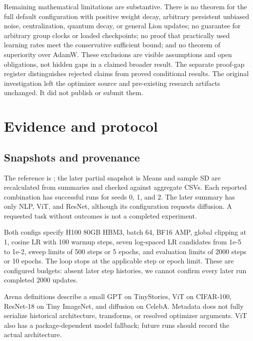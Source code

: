 \documentclass[11pt,a4paper]{article}
\theoremstyle{definition}
\theoremstyle{remark}
\begin{document}
Remaining mathematical limitations are substantive. There is no theorem for
the full default configuration with positive weight decay, arbitrary
persistent unbiased noise, centralization, quantum decay, or general Lion
updates; no guarantee for arbitrary group clocks or loaded checkpoints; no
proof that practically used learning rates meet the conservative sufficient
bound; and no theorem of superiority over AdamW. These exclusions are visible
assumptions and open obligations, not hidden gaps in a claimed broader result.
The separate proof-gap register distinguishes rejected claims from proved
conditional results. The original investigation left the optimizer source and
pre-existing research artifacts unchanged. It did not publish or submit them.


\clearpage
\setlength{\parskip}{4pt}
\section{Evidence and protocol}\label{sec:evidence}

\subsection{Snapshots and provenance}

The reference is ; the later partial snapshot is  Means and sample SD are recalculated from summaries and checked against aggregate CSVs. Each reported combination has successful runs for seeds 0, 1, and 2. The later summary has only NLP, ViT, and ResNet, although its configuration requests diffusion. A requested task without outcomes is not a completed experiment.

Both configs specify H100 80GB HBM3, batch 64, BF16 AMP, global clipping at 1, cosine LR with 100 warmup steps, seven log-spaced LR candidates from 1e-5 to 1e-2, sweep limits of 500 steps or 5 epochs, and evaluation limits of 2000 steps or 10 epochs. The loop stops at the applicable step or epoch limit. These are configured budgets: absent later step histories, we cannot confirm every later run completed 2000 updates.

Arena definitions describe a small GPT on TinyStories, ViT on CIFAR-100, ResNet-18 on Tiny ImageNet, and  diffusion on CelebA. Metadata does not fully serialize historical architecture, transforms, or resolved optimizer arguments. ViT also has a package-dependent model fallback; future runs should record the actual architecture.
\end{document}
